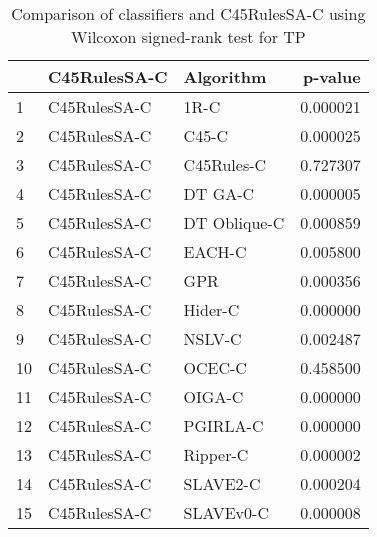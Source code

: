 \begin{table}
\footnotesize
\caption{Comparison of classifiers and C45RulesSA-C using Wilcoxon signed-rank test for TP}
\label{tab:C45RulesSA-C wilcoxon TP comparison}
\begin{tabular}{lllr}
\hline
 & C45RulesSA-C & Algorithm & p-value \\
\hline
1 & C45RulesSA-C & 1R-C & 0.000021 \\
2 & C45RulesSA-C & C45-C & 0.000025 \\
3 & C45RulesSA-C & C45Rules-C & 0.727307 \\
4 & C45RulesSA-C & DT GA-C & 0.000005 \\
5 & C45RulesSA-C & DT Oblique-C & 0.000859 \\
6 & C45RulesSA-C & EACH-C & 0.005800 \\
7 & C45RulesSA-C & GPR & 0.000356 \\
8 & C45RulesSA-C & Hider-C & 0.000000 \\
9 & C45RulesSA-C & NSLV-C & 0.002487 \\
10 & C45RulesSA-C & OCEC-C & 0.458500 \\
11 & C45RulesSA-C & OIGA-C & 0.000000 \\
12 & C45RulesSA-C & PGIRLA-C & 0.000000 \\
13 & C45RulesSA-C & Ripper-C & 0.000002 \\
14 & C45RulesSA-C & SLAVE2-C & 0.000204 \\
15 & C45RulesSA-C & SLAVEv0-C & 0.000008 \\
\hline
\end{tabular}
\end{table}
